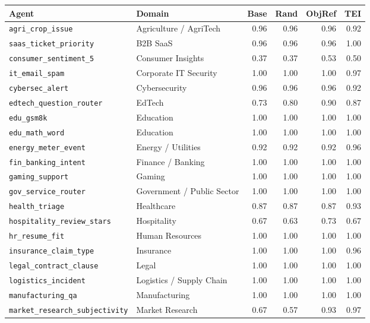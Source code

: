\begin{tabular}{llrrrr}
\toprule
Agent & Domain & Base & Rand & ObjRef & TEI \\
\midrule
\texttt{\small agri\_crop\_issue} & Agriculture / AgriTech & 0.96 & 0.96 & 0.96 & 0.92 \\
\texttt{\small saas\_ticket\_priority} & B2B SaaS & 0.96 & 0.96 & 0.96 & 1.00 \\
\texttt{\small consumer\_sentiment\_5} & Consumer Insights & 0.37 & 0.37 & 0.53 & 0.50 \\
\texttt{\small it\_email\_spam} & Corporate IT Security & 1.00 & 1.00 & 1.00 & 0.97 \\
\texttt{\small cybersec\_alert} & Cybersecurity & 0.96 & 0.96 & 0.96 & 0.92 \\
\texttt{\small edtech\_question\_router} & EdTech & 0.73 & 0.80 & 0.90 & 0.87 \\
\texttt{\small edu\_gsm8k} & Education & 1.00 & 1.00 & 1.00 & 1.00 \\
\texttt{\small edu\_math\_word} & Education & 1.00 & 1.00 & 1.00 & 1.00 \\
\texttt{\small energy\_meter\_event} & Energy / Utilities & 0.92 & 0.92 & 0.92 & 0.96 \\
\texttt{\small fin\_banking\_intent} & Finance / Banking & 1.00 & 1.00 & 1.00 & 1.00 \\
\texttt{\small gaming\_support} & Gaming & 1.00 & 1.00 & 1.00 & 1.00 \\
\texttt{\small gov\_service\_router} & Government / Public Sector & 1.00 & 1.00 & 1.00 & 1.00 \\
\texttt{\small health\_triage} & Healthcare & 0.87 & 0.87 & 0.87 & 0.93 \\
\texttt{\small hospitality\_review\_stars} & Hospitality & 0.67 & 0.63 & 0.73 & 0.67 \\
\texttt{\small hr\_resume\_fit} & Human Resources & 1.00 & 1.00 & 1.00 & 1.00 \\
\texttt{\small insurance\_claim\_type} & Insurance & 1.00 & 1.00 & 1.00 & 0.96 \\
\texttt{\small legal\_contract\_clause} & Legal & 1.00 & 1.00 & 1.00 & 1.00 \\
\texttt{\small logistics\_incident} & Logistics / Supply Chain & 1.00 & 1.00 & 1.00 & 1.00 \\
\texttt{\small manufacturing\_qa} & Manufacturing & 1.00 & 1.00 & 1.00 & 1.00 \\
\texttt{\small market\_research\_subjectivity} & Market Research & 0.67 & 0.57 & 0.93 & 0.97 \\

\end{tabular}
